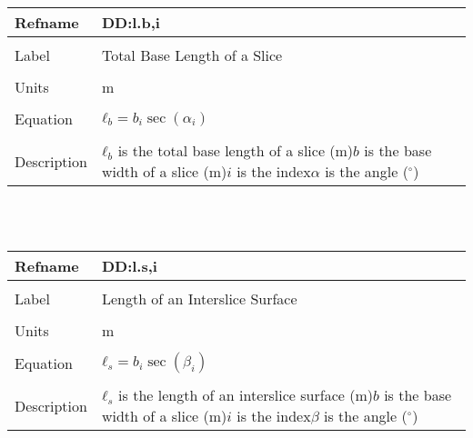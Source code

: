\documentclass[12pt]{article}
\begin{document}
\noindent \begin{minipage}{\textwidth}
\begin{tabular}{p{} p{}}
\toprule \textbf{Refname} & \textbf{DD:l.b,i}
\label{DD:l.b,i}
\\ \midrule \\
Label & Total Base Length of a Slice
\\ \midrule \\
Units & m
\\ \midrule \\
Equation & ${ℓ_{b}}=b_{i} \sec\left(α_{i}\right)$
\\ \midrule \\
Description & ${ℓ_{b}}$ is the total base length of a slice (m)\newline$b$ is the base width of a slice (m)\newline$i$ is the index\newline$α$ is the angle (${}^{\circ}$)
\\ \bottomrule \end{tabular}
\end{minipage}\\
~\newline
\noindent \begin{minipage}{\textwidth}
\begin{tabular}{p{} p{}}
\toprule \textbf{Refname} & \textbf{DD:l.s,i}
\label{DD:l.s,i}
\\ \midrule \\
Label & Length of an Interslice Surface
\\ \midrule \\
Units & m
\\ \midrule \\
Equation & ${ℓ_{s}}=b_{i} \sec\left(β_{i}\right)$
\\ \midrule \\
Description & ${ℓ_{s}}$ is the length of an interslice surface (m)\newline$b$ is the base width of a slice (m)\newline$i$ is the index\newline$β$ is the angle (${}^{\circ}$)
\\ \bottomrule \end{tabular}
\end{minipage}\\
~\newline
\end{document}
